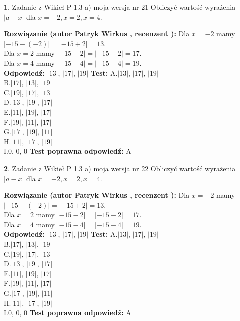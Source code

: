 \documentclass[12pt, a4paper]{article}
\theoremstyle{definition} %
\newtheorem{zad}{}
\newcommand{\zadStart}[1]{\begin{zad}#1\newline}
\newcommand{\zadStop}{\end{zad}}
\newcommand{\rozwStart}[2]{\noindent \textbf{Rozwiązanie (autor #1 , recenzent #2): }\newline}
\newcommand{\rozwStop}{\newline}
\newcommand{\odpStart}{\noindent \textbf{Odpowiedź:}\newline}
\newcommand{\odpStop}{\newline}
\newcommand{\testStart}{\noindent \textbf{Test:}\newline}
\newcommand{\testStop}{\newline}
\newcommand{\kluczStart}{\noindent \textbf{Test poprawna odpowiedź:}\newline}
\newcommand{\kluczStop}{\newline}
\begin{document}
\zadStart{Zadanie z Wikieł P 1.3 a) moja wersja nr 21}
Obliczyć wartość wyrażenia $|a - x|$ dla $x=-2,x=2,x=4$.
\zadStop
\rozwStart{Patryk Wirkus}{}
Dla $x = -2$ mamy $|-15 - (-2)| = |-15 + 2| = 13$.\\
Dla $x = 2$ mamy $|-15 - 2| = |-15 - 2| = 17$.\\
Dla $x = 4$ mamy $|-15 - 4| = |-15 - 4| = 19$.\\
\rozwStop
\odpStart
$|13|$, $|17|$, $|19|$
\odpStop
\testStart
A.$|13|$, $|17|$, $|19|$\\
B.$|17|$, $|13|$, $|19|$\\
C.$|19|$, $|17|$, $|13|$\\
D.$|13|$, $|19|$, $|17|$\\
E.$|11|$, $|19|$, $|17|$\\
F.$|19|$, $|11|$, $|17|$\\
G.$|17|$, $|19|$, $|11|$\\
H.$|11|$, $|17|$, $|19|$\\
I.$0$, $0$, $0$
\testStop
\kluczStart
A
\kluczStop



\zadStart{Zadanie z Wikieł P 1.3 a) moja wersja nr 22}
Obliczyć wartość wyrażenia $|a - x|$ dla $x=-2,x=2,x=4$.
\zadStop
\rozwStart{Patryk Wirkus}{}
Dla $x = -2$ mamy $|-15 - (-2)| = |-15 + 2| = 13$.\\
Dla $x = 2$ mamy $|-15 - 2| = |-15 - 2| = 17$.\\
Dla $x = 4$ mamy $|-15 - 4| = |-15 - 4| = 19$.\\
\rozwStop
\odpStart
$|13|$, $|17|$, $|19|$
\odpStop
\testStart
A.$|13|$, $|17|$, $|19|$\\
B.$|17|$, $|13|$, $|19|$\\
C.$|19|$, $|17|$, $|13|$\\
D.$|13|$, $|19|$, $|17|$\\
E.$|11|$, $|19|$, $|17|$\\
F.$|19|$, $|11|$, $|17|$\\
G.$|17|$, $|19|$, $|11|$\\
H.$|11|$, $|17|$, $|19|$\\
I.$0$, $0$, $0$
\testStop
\kluczStart
A
\kluczStop
\end{document}
